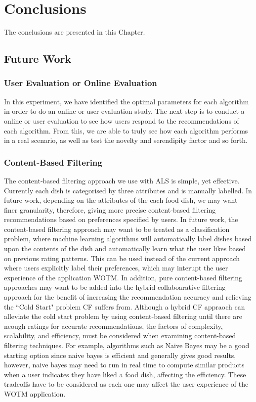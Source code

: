\chapter{Conclusions}\label{C:con}
The conclusions are presented in this Chapter.


\section{Future Work}

\subsection{User Evaluation or Online Evaluation}
In this experiment, we have identified the optimal parameters for each algorithm in order to do an online or user evaluation study. The next step is to conduct a online or user evaluation to see how users respond to the recommendations of each algorithm. From this, we are able to truly see how each algorithm performs in a real scenario, as well as test the novelty and serendipity factor and so forth. 

\subsection{Content-Based Filtering}
The content-based filtering approach we use with ALS is simple, yet effective. Currently each dish is categorised by three attributes and is manually labelled. In future work, depending on the attributes of the each food dish, we may want finer granularity, therefore, giving more precise content-based filtering recommendations based on preferences specified by users.  In future work, the content-based filtering approach may want to be treated as a classification problem, where machine learning algorithms will automatically label dishes based upon the contents of the dish and automatically learn what the user likes based on previous rating patterns. This can be used instead of the current approach where users explicitly label their preferences, which may interupt the user experience of the application WOTM. In addition, pure content-based filtering approaches may want to be added into the hybrid collaboarative filtering approach for the benefit of increasing the recommendation accuracy and relieving the ``Cold Start" problem CF suffers from. Although a hybrid CF appraoch can alleviate the cold start problem by using content-based filtering until there are neough ratings for accurate recommendations, the factors of complexity, scalability, and efficiency, must be considered when examining content-based filtering techniques. For example, algorithms such as Naive Bayes may be a good starting option since naive bayes is efficient and generally gives good results, however, naive bayes may need to run in real time to compute similar products when a user indicates they have liked a food dish, affecting the efficiency. These tradeoffs have to be considered as each one may affect the user experience of the WOTM application. 

